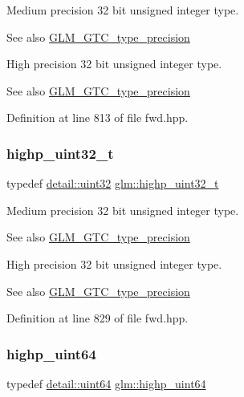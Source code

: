 Medium precision 32 bit unsigned integer type. \begin{DoxySeeAlso}{See also}
\mbox{\hyperlink{group__gtc__type__precision}{G\+L\+M\+\_\+\+G\+T\+C\+\_\+type\+\_\+precision}}
\end{DoxySeeAlso}
High precision 32 bit unsigned integer type. \begin{DoxySeeAlso}{See also}
\mbox{\hyperlink{group__gtc__type__precision}{G\+L\+M\+\_\+\+G\+T\+C\+\_\+type\+\_\+precision}} 
\end{DoxySeeAlso}


Definition at line 813 of file fwd.\+hpp.

\mbox{\label{group__gtc__type__precision_ga8eb85ad460079c63b68866ae34637bda}} 
\subsubsection{\texorpdfstring{highp\_uint32\_t}{highp\_uint32\_t}}
{\footnotesize\ttfamily typedef \mbox{\hyperlink{namespaceglm_1_1detail_ade6cfbf377022aaa391af8cd50489222}{detail\+::uint32}} \mbox{\hyperlink{group__gtc__type__precision_ga8eb85ad460079c63b68866ae34637bda}{glm\+::highp\+\_\+uint32\+\_\+t}}}

Medium precision 32 bit unsigned integer type. \begin{DoxySeeAlso}{See also}
\mbox{\hyperlink{group__gtc__type__precision}{G\+L\+M\+\_\+\+G\+T\+C\+\_\+type\+\_\+precision}}
\end{DoxySeeAlso}
High precision 32 bit unsigned integer type. \begin{DoxySeeAlso}{See also}
\mbox{\hyperlink{group__gtc__type__precision}{G\+L\+M\+\_\+\+G\+T\+C\+\_\+type\+\_\+precision}} 
\end{DoxySeeAlso}


Definition at line 829 of file fwd.\+hpp.

\mbox{\label{group__gtc__type__precision_ga8079c653e20cda03d34b99de629a7b09}} 
\subsubsection{\texorpdfstring{highp\_uint64}{highp\_uint64}}
{\footnotesize\ttfamily typedef \mbox{\hyperlink{namespaceglm_1_1detail_adec4b19bf4982125e122db2fe03c5810}{detail\+::uint64}} \mbox{\hyperlink{group__gtc__type__precision_ga8079c653e20cda03d34b99de629a7b09}{glm\+::highp\+\_\+uint64}}}

